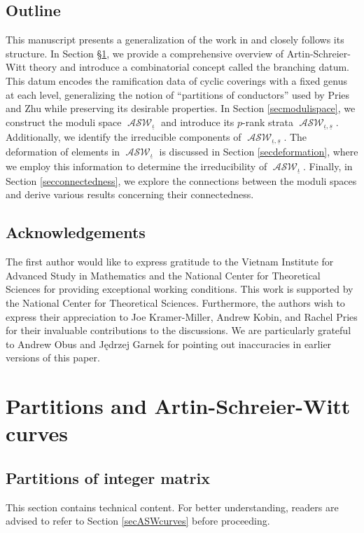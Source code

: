 \documentclass{compositio}
\theoremstyle{remark}
\theoremstyle{remark}
\DeclareMathOperator{\ASW}{\mathcal{ASW}}
\begin{document}
\subsection{Outline} This manuscript presents a generalization of the work in \cite{MR2985514} and closely follows its structure. In Section \S \ref{secpartionASW}, we provide a comprehensive overview of Artin-Schreier-Witt theory and introduce a combinatorial concept called the branching datum. This datum encodes the ramification data of cyclic coverings with a fixed genus at each level, generalizing the notion of ``partitions of conductors'' used by Pries and Zhu while preserving its desirable properties. In Section \ref{secmodulispace}, we construct the moduli space $\ASW_{\underline{\iota}}$ and introduce its $p$-rank strata $\ASW_{\underline{\iota},\underline{s}}$. Additionally, we identify the irreducible components of $\ASW_{\underline{\iota},\underline{s}}$. The deformation of elements in $\ASW_{\underline{\iota}}$ is discussed in Section \ref{secdeformation}, where we employ this information to determine the irreducibility of $\ASW_{\underline{\iota}}$. Finally, in Section \ref{secconnectedness}, we explore the connections between the moduli spaces and derive various results concerning their connectedness.

\subsection{Acknowledgements}
The first author would like to express gratitude to the Vietnam Institute for Advanced Study in Mathematics and the National Center for Theoretical Sciences for providing exceptional working conditions. This work is supported by the National Center for Theoretical Sciences. Furthermore, the authors wish to express their appreciation to Joe Kramer-Miller, Andrew Kobin, and Rachel Pries for their invaluable contributions to the discussions. We are particularly grateful to Andrew Obus and J\k{e}drzej Garnek for pointing out inaccuracies in earlier versions of this paper.

\section{Partitions and Artin-Schreier-Witt curves}
\label{secpartionASW}

\subsection{Partitions of integer matrix}
\label{secpartitionmatrix}
This section contains technical content. For better understanding, readers are advised to refer to Section \ref{secASWcurves} before proceeding.
\end{document}
